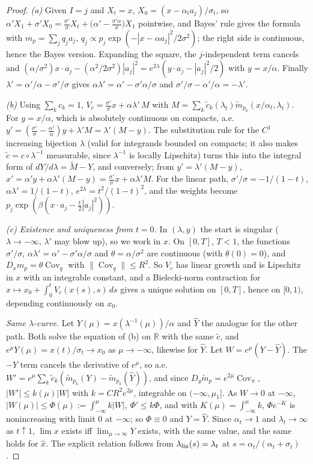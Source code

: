 \documentclass[11pt]{article}
\theoremstyle{definition}
\theoremstyle{remark}
\newcommand{\R}{\mathbb R}
\DeclareMathOperator{\Cov}{Cov}
\begin{document}
\begin{proof}
\emph{(a)} Given $I=j$ and $X_t=x$, $X_0=(x-\alpha_ta_j)/\sigma_t$, so
$\alpha'X_1+\sigma'X_0=\frac{\sigma'}\sigma X_t+\big(\alpha'-\frac{\sigma'\alpha}\sigma\big)X_1$ pointwise, and
Bayes' rule gives the formula with $m_p=\sum_jq_ja_j$, $q_j\propto p_j\exp(-|x-\alpha a_j|^2/2\sigma^2)$;
the right side is continuous, hence the Bayes version. Expanding the square, the $j$-independent term
cancels and $(\alpha/\sigma^2)x\cdot a_j-(\alpha^2/2\sigma^2)|a_j|^2=e^{2\lambda}(y\cdot a_j-|a_j|^2/2)$ with
$y=x/\alpha$. Finally $\lambda'=\alpha'/\alpha-\sigma'/\sigma$ gives $\alpha\lambda'=\alpha'-\sigma'\alpha/\sigma$ and
$\sigma'/\sigma-\alpha'/\alpha=-\lambda'$.

\emph{(b)} Using $\sum_kc_k=1$, $V_c=\frac{\sigma'}\sigma x+\alpha\lambda'\,M$ with
$M=\sum_k\tilde c_k(\lambda_t)\tilde m_{p_k}(x/\alpha_t,\lambda_t)$. For $y=x/\alpha$, which is absolutely
continuous on compacts, a.e.\ $y'=(\frac{\sigma'}\sigma-\frac{\alpha'}\alpha)y+\lambda'M=\lambda'(M-y)$. The
substitution rule for the $C^1$ increasing bijection $\lambda$ (valid for integrands bounded on compacts;
it also makes $\tilde c=c\circ\lambda^{-1}$ measurable, since $\lambda^{-1}$ is locally Lipschitz) turns
this into the integral form of $dY/d\lambda=\tilde M-Y$, and conversely; from $y'=\lambda'(M-y)$,
$x'=\alpha'y+\alpha\lambda'(M-y)=\frac{\sigma'}\sigma x+\alpha\lambda'M$. For the linear path,
$\sigma'/\sigma=-1/(1-t)$, $\alpha\lambda'=1/(1-t)$, $e^{2\lambda}=t^2/(1-t)^2$, and the weights become
$p_j\exp(\beta(x\cdot a_j-\frac t2|a_j|^2))$.

\emph{(c)} \emph{Existence and uniqueness from $t=0$.} In $(\lambda,y)$ the start is singular
($\lambda\to-\infty$, $\lambda'$ may blow up), so we work in $x$. On $[0,T]$, $T<1$, the functions
$\sigma'/\sigma$, $\alpha\lambda'=\alpha'-\sigma'\alpha/\sigma$ and $\theta=\alpha/\sigma^2$ are continuous (with
$\theta(0)=0$), and $D_xm_p=\theta\Cov_q$ with $\|\Cov_q\|\le R^2$. So $V_c$ has linear growth and is
Lipschitz in $x$ with an integrable constant, and a Bielecki-norm contraction for
$x\mapsto x_0+\int_0^tV_c(x(s),s)\,ds$ gives a unique solution on $[0,T]$, hence on $[0,1)$, depending
continuously on $x_0$.

\emph{Same $\lambda$-curve.} Let $Y(\mu)=x(\lambda^{-1}(\mu))/\alpha$ and $\hat Y$ the analogue for the
other path. Both solve the equation of (b) on $\R$ with the same $\tilde c$, and
$e^\mu Y(\mu)=x(t)/\sigma_t\to x_0$ as $\mu\to-\infty$, likewise for $\hat Y$. Let
$W=e^\mu(Y-\hat Y)$. The $-Y$ term cancels the derivative of $e^\mu$, so a.e.
$W'=e^\mu\sum_k\tilde c_k(\tilde m_{p_k}(Y)-\tilde m_{p_k}(\hat Y))$, and since
$D_y\tilde m_p=e^{2\mu}\Cov_\pi$, $|W'|\le k(\mu)|W|$ with $k=CR^2e^{2\mu}$, integrable on
$(-\infty,\mu_1]$. As $W\to0$ at $-\infty$, $|W(\mu)|\le\Phi(\mu):=\int_{-\infty}^\mu k|W|$,
$\Phi'\le k\Phi$, and with $K(\mu)=\int_{-\infty}^\mu k$, $\Phi e^{-K}$ is nonincreasing with limit $0$ at
$-\infty$; so $\Phi\equiv0$ and $Y=\hat Y$. Since $\alpha_t\to1$ and $\lambda_t\to\infty$ as $t\uparrow1$,
$\lim x$ exists iff $\lim_{\mu\to\infty}Y$ exists, with the same value, and the same holds for $\hat x$. The
explicit relation follows from $\lambda_{\rm lin}(s)=\lambda_t$ at $s=\alpha_t/(\alpha_t+\sigma_t)$.


\end{proof}
\end{document}
